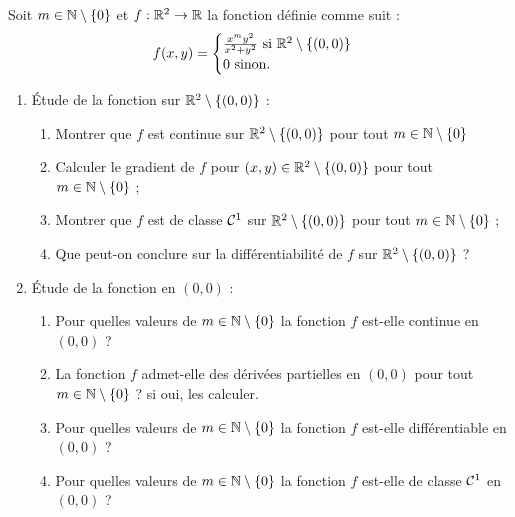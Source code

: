 \documentclass[a4paper]{article}
\begin{document}
Soit $m\in \mathbb{N}\setminus \left\{ 0 \right\}$ et $f : \mathbb{R}^2 \to \mathbb{R}$ la fonction définie comme suit :
\[
	f(x,y) = \begin{cases}
		\frac{x^m y^2}{x^2 + y^2} \text{ si } \mathbb{R}^2 \setminus \{ (0, 0) \} \\
		0 \text{ sinon}.
	\end{cases}
\]

\begin{enumerate}
	\item  Étude de la fonction sur $\mathbb{R}^2 \setminus \{ (0, 0) \}$ :
		\begin{enumerate}
			\item Montrer que $f$ est continue sur $\mathbb{R}^2 \setminus \{ (0,0) \}$ pour tout $m \in \mathbb{N}\setminus \left\{ 0 \right\}$ 
\vspace*{3cm}
			\item Calculer le gradient de $f$ pour $(x, y) \in \mathbb{R}^2 \setminus \{ (0, 0) \}$ pour tout $m \in \mathbb{N}\setminus \left\{ 0 \right\}$ ;
\vspace*{5cm}
			\item Montrer que $f$ est de classe $\mathcal{C}^{1}$ sur $\mathbb{R}^2 \setminus \{ (0, 0) \}$ pour tout $m \in \mathbb{N}\setminus \left\{ 0 \right\}$ ;
\vspace*{3cm}
			\item Que peut-on conclure sur la différentiabilité de $f$ sur $\mathbb{R}^2 \setminus \{ (0, 0) \}$ ?
\vspace*{3cm}
		\end{enumerate}
	\item  Étude de la fonction en $(0, 0)$ :
		\begin{enumerate}
			\item Pour quelles valeurs de $m\in\mathbb{N}\setminus \left\{ 0 \right\}$ la fonction $f$ est-elle continue en $(0, 0)$ ?
\vfill
			\item La fonction $f$ admet-elle des dérivées partielles en $(0, 0)$ pour tout $m\in\mathbb{N}\setminus \left\{ 0 \right\}$ ? si oui, les calculer.
\vspace*{5cm}
			\item Pour quelles valeurs de $m\in\mathbb{N}\setminus \left\{ 0 \right\}$ la fonction $f$ est-elle différentiable en $(0, 0)$ ?
\vspace*{12cm}
			\item Pour quelles valeurs de $m\in\mathbb{N}\setminus \left\{ 0 \right\}$ la fonction $f$ est-elle de classe $\mathcal{C}^{1}$ en $(0, 0)$ ?
\vfill
		\end{enumerate}
\end{enumerate}

\end{document}
